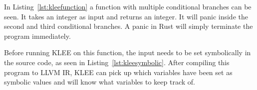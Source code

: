 In Listing~\ref{lst:kleefunction} a function with multiple conditional branches
can be seen. It takes an integer as input and returns an integer. It will
panic inside the second and third conditional branches. A panic in Rust will
simply terminate the program immediately.


Before running KLEE on this function, the input needs to be set symbolically in
the source code, as seen in Listing~\ref{lst:kleesymbolic}. After compiling this
program to LLVM IR, KLEE can pick up which variables have been set as symbolic
values and will know what variables to keep track of.



